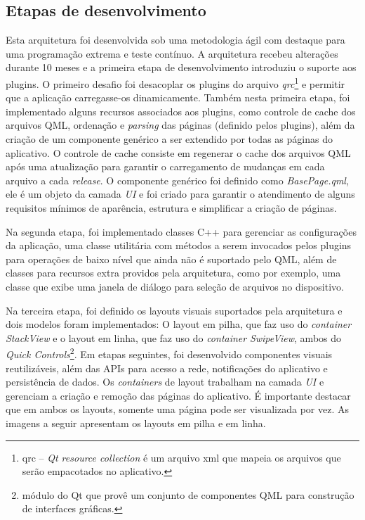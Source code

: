 \subsection{Etapas de desenvolvimento}
Esta arquitetura foi desenvolvida sob uma metodologia ágil com destaque para uma programação extrema e teste contínuo. A arquitetura recebeu alterações durante 10 meses e a primeira etapa de desenvolvimento introduziu o suporte aos plugins. O primeiro desafio foi desacoplar os plugins do arquivo \textit{qrc}\footnote{qrc – \textit{Qt resource collection} é um arquivo xml que mapeia os arquivos que serão empacotados no aplicativo.} e permitir que a aplicação carregasse-os dinamicamente. Também nesta primeira etapa, foi implementado alguns recursos associados aos plugins, como controle de cache dos arquivos QML, ordenação e \textit{parsing} das páginas (definido pelos plugins), além da criação de um componente genérico a ser extendido por todas as páginas do aplicativo. O controle de cache consiste em regenerar o cache dos arquivos QML após uma atualização para garantir o carregamento de mudanças em cada arquivo a cada \textit{release}. O componente genérico foi definido como \textit{BasePage.qml}, ele é um objeto da camada \textit{UI} e foi criado para garantir o atendimento de alguns requisitos mínimos de aparência, estrutura e simplificar a criação de páginas.\par

Na segunda etapa, foi implementado classes C++ para gerenciar as configurações da aplicação, uma classe utilitária com métodos a serem invocados pelos plugins para operações de baixo nível que ainda não é suportado pelo QML, além de classes para recursos extra providos pela arquitetura, como por exemplo, uma classe que exibe uma janela de diálogo para seleção de arquivos no dispositivo.\par

Na terceira etapa, foi definido os layouts visuais suportados pela arquitetura e dois modelos foram implementados: O layout em pilha, que faz uso do \textit{container} \textit{StackView} e o layout em linha, que faz uso do \textit{container} \textit{SwipeView}, ambos do \textit{Quick Controls}\footnote{módulo do Qt que provê um conjunto de componentes QML para construção de interfaces gráficas.}. Em etapas seguintes, foi desenvolvido componentes visuais reutilizáveis, além das APIs para acesso a rede, notificações do aplicativo e persistência de dados. Os \textit{containers} de layout trabalham na camada \textit{UI} e gerenciam a criação e remoção das páginas do aplicativo. É importante destacar que em ambos os layouts, somente uma página pode ser visualizada por vez. As imagens a seguir apresentam os layouts em pilha e em linha.

